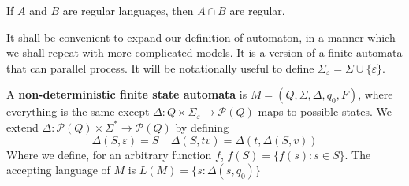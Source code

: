 \begin{corollary}
    If $A$ and $B$ are regular languages, then $A \cap B$ are regular.
\end{corollary}

It shall be convenient to expand our definition of automaton, in a manner which we shall repeat with more complicated models. It is a version of a finite automata that can parallel process. It will be notationally useful to define $\Sigma_\varepsilon = \Sigma \cup \{ \varepsilon \}$.

\begin{definition}
    A {\bf non-deterministic finite state automata} is $M = (Q, \Sigma, \Delta, q_0, F)$, where everything is the same except $\Delta: Q \times \Sigma_\varepsilon \to \mathcal{P}(Q)$ maps to possible states. We extend $\Delta: \mathcal{P}(Q) \times \Sigma^* \to \mathcal{P}(Q)$ by defining
    \[ \Delta(S, \varepsilon) = S\ \ \ \ \ \Delta(S,tv) = \Delta(t, \Delta(S,v)) \]
    Where we define, for an arbitrary function $f$, $f(S) = \{ f(s) : s \in S \}$. The accepting language of $M$ is $L(M) = \{ s : \Delta(s,q_0) \}$
\end{definition}

